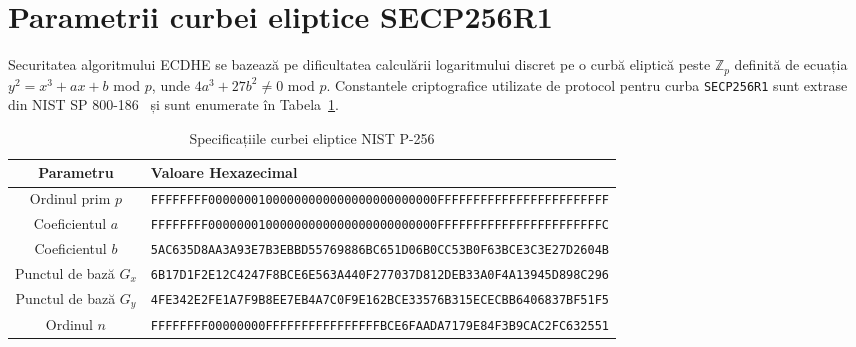 \section{Parametrii curbei eliptice SECP256R1}
\label{anexa:cripto_ec}
Securitatea algoritmului ECDHE se bazează pe dificultatea calculării logaritmului discret pe o curbă eliptică peste $\mathbb{Z}_p$ definită de ecuația $y^2 = x^3 + ax + b$ mod $p$, unde $4a^3 + 27b^2 \neq 0$ mod $p$. Constantele criptografice utilizate de protocol pentru curba \texttt{SECP256R1} sunt extrase din NIST SP 800-186~\cite{nist_sp800_186} și sunt enumerate în Tabela~\ref{tab:ec_specs}.

\begin{table}[htbp]
    \centering
    \small
    \renewcommand{\arraystretch}{1.1}
    \begin{tabular}{|c|>{\raggedright\arraybackslash}p{13cm}|}
        \hline
        \textbf{Parametru} & \textbf{Valoare Hexazecimal} \\
        \hline
        Ordinul prim $p$ & \texttt{FFFFFFFF00000001000000000000000000000000FFFFFFFFFFFFFFFFFFFFFFFF} \\
        \hline
        Coeficientul $a$ & \texttt{FFFFFFFF00000001000000000000000000000000FFFFFFFFFFFFFFFFFFFFFFFC} \\
        \hline
        Coeficientul $b$ & \texttt{5AC635D8AA3A93E7B3EBBD55769886BC651D06B0CC53B0F63BCE3C3E27D2604B} \\
        \hline
        Punctul de bază $G_x$ & \texttt{6B17D1F2E12C4247F8BCE6E563A440F277037D812DEB33A0F4A13945D898C296} \\
        \hline
        Punctul de bază $G_y$ & \texttt{4FE342E2FE1A7F9B8EE7EB4A7C0F9E162BCE33576B315ECECBB6406837BF51F5} \\
        \hline
        Ordinul $n$ & \texttt{FFFFFFFF00000000FFFFFFFFFFFFFFFFBCE6FAADA7179E84F3B9CAC2FC632551} \\
        \hline
    \end{tabular}
    \caption{Specificațiile curbei eliptice NIST P-256}
    \label{tab:ec_specs}
\end{table}
